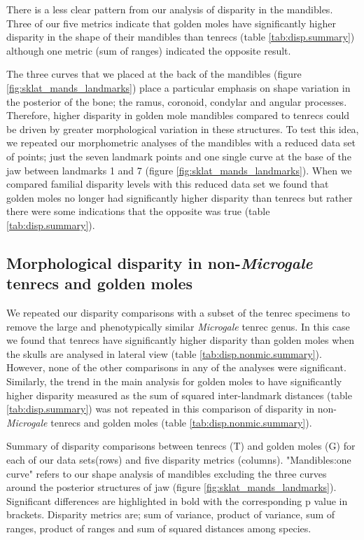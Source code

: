 \documentclass[12pt,a4paper]{article}
\begin{document}
	There is a less clear pattern from our analysis of disparity in the mandibles. Three of our five metrics indicate that golden moles have significantly higher disparity in the shape of their mandibles than tenrecs (table \ref{tab:disp.summary}) although one metric (sum of ranges) indicated the opposite result. 
	
	The three curves that we placed at the back of the mandibles (figure \ref{fig:sklat_mands_landmarks}) place a particular emphasis on shape variation in the posterior of the bone; the ramus, coronoid, condylar and angular processes. Therefore, higher disparity in golden mole mandibles compared to tenrecs could be driven by greater morphological variation in these structures. To test this idea, we repeated our morphometric analyses of the mandibles with a reduced data set of points; just the seven landmark points and one single curve at the base of the jaw between landmarks 1 and 7 (figure \ref{fig:sklat_mands_landmarks}). When we compared familial disparity levels with this reduced data set we found that golden moles no longer had significantly higher disparity than tenrecs but rather there were some indications that the opposite was true (table \ref{tab:disp.summary}).
	
\subsection{Morphological disparity in non-\textit{Microgale} tenrecs and golden moles} 	   
	
	We repeated our disparity comparisons with a subset of the tenrec specimens to remove the large and phenotypically similar \textit{Microgale} tenrec genus. In this case we found that tenrecs have significantly higher disparity than golden moles when the skulls are analysed in lateral view (table \ref{tab:disp.nonmic.summary}). However, none of the other comparisons in any of the analyses were significant. Similarly, the trend in the main analysis for golden moles to have significantly higher disparity measured as the sum of squared inter-landmark distances (table \ref{tab:disp.summary}) was not repeated in this comparison of disparity in non-\textit{Microgale} tenrecs and golden moles (table \ref{tab:disp.nonmic.summary}).



	\begin{table}[h]			
	\caption{Summary of disparity comparisons between tenrecs (T) and golden moles (G) for each of our data sets(rows) and five disparity metrics (columns). "Mandibles:one curve" refers to our shape analysis of mandibles excluding the three curves around the posterior structures of jaw (figure \ref{fig:sklat_mands_landmarks}). Significant differences are highlighted in bold with the corresponding p value in brackets. Disparity metrics are; sum of variance, product of variance, sum of ranges, product of ranges and sum of squared distances among species. }
	\centering
	 
	\label{tab:disp.summary}  
	\end{table}
\end{document}
